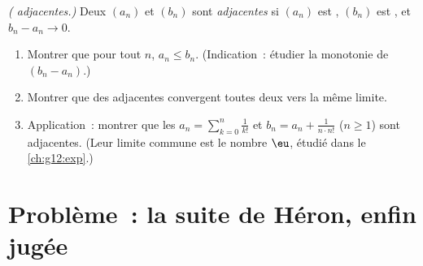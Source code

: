 \begin{exercise}[$\star\star\star$]\label{exo:g12:seq:10}
\emph{( adjacentes.)} Deux  $(a_n)$ et $(b_n)$ sont
\emph{adjacentes} si $(a_n)$ est , $(b_n)$ est , et
$b_n - a_n \to 0$.
\begin{enumerate}
  \item Montrer que pour tout $n$, $a_n \leq b_n$. (Indication~: étudier
        la monotonie de $(b_n - a_n)$.)
  \item Montrer que des  adjacentes convergent toutes deux vers la
        même limite.
  \item Application~: montrer que les 
        $a_n = \sum_{k=0}^{n} \frac{1}{k!}$ et
        $b_n = a_n + \frac{1}{n \cdot n!}$ ($n \geq 1$) sont adjacentes.
        (Leur limite commune est le nombre $\eu$, étudié dans le
        \cref{ch:g12:exp}.)
\end{enumerate}
\end{exercise}

\section{Problème~: la suite de Héron, enfin jugée}

